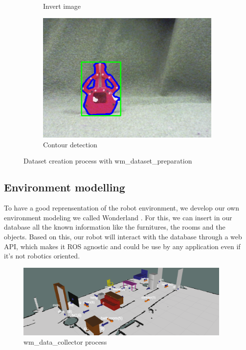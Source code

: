 \documentclass[runningheads,a4paper]{llncs}
\begin{document}
\begin{figure}[h!]
\begin{subfigure}[b]{0.3\linewidth}
    \caption{Invert image}
  \end{subfigure}
  \begin{subfigure}[b]{0.3\linewidth}
    \includegraphics[width=\linewidth]{images/bounding_contours.png}
    \caption{Contour detection}
  \end{subfigure}
  \caption{Dataset creation process with wm\_dataset\_preparation}
  \label{fig:coffee}
\end{figure}  
 
\subsection{Environment modelling}
\tab To have a good reprensentation of the robot environment, we develop our own environment modeling we called Wonderland \cite{wonderland}. For this, we can insert in our database all the known information like the furnitures, the rooms and the objects. Based on this, our robot will interact with the database through a web API, which makes it ROS agnostic and could be use by any application even if it's not robotics oriented.\\

\begin{figure}
  \centering
  \includegraphics[width=300pt]{images/wonderland.png}
  \caption{ wm\_data\_collector process}
\end{figure} 
\end{document}
